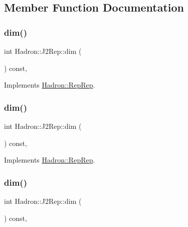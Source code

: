 \subsection{Member Function Documentation}
\mbox{\label{structHadron_1_1J2Rep_a9bbfe6d82db1e96beda068411ff79371}} 
\subsubsection{\texorpdfstring{dim()}{dim()}\hspace{0.1cm}{\footnotesize\ttfamily [1/5]}}
{\footnotesize\ttfamily int Hadron\+::\+J2\+Rep\+::dim (\begin{DoxyParamCaption}{ }\end{DoxyParamCaption}) const\hspace{0.3cm}{\ttfamily [inline]}, {\ttfamily [virtual]}}



Implements \mbox{\hyperlink{structHadron_1_1RepRep_a92c8802e5ed7afd7da43ccfd5b7cd92b}{Hadron\+::\+Rep\+Rep}}.

\mbox{\label{structHadron_1_1J2Rep_a9bbfe6d82db1e96beda068411ff79371}} 
\subsubsection{\texorpdfstring{dim()}{dim()}\hspace{0.1cm}{\footnotesize\ttfamily [2/5]}}
{\footnotesize\ttfamily int Hadron\+::\+J2\+Rep\+::dim (\begin{DoxyParamCaption}{ }\end{DoxyParamCaption}) const\hspace{0.3cm}{\ttfamily [inline]}, {\ttfamily [virtual]}}



Implements \mbox{\hyperlink{structHadron_1_1RepRep_a92c8802e5ed7afd7da43ccfd5b7cd92b}{Hadron\+::\+Rep\+Rep}}.

\mbox{\label{structHadron_1_1J2Rep_a9bbfe6d82db1e96beda068411ff79371}} 
\subsubsection{\texorpdfstring{dim()}{dim()}\hspace{0.1cm}{\footnotesize\ttfamily [3/5]}}
{\footnotesize\ttfamily int Hadron\+::\+J2\+Rep\+::dim (\begin{DoxyParamCaption}{ }\end{DoxyParamCaption}) const\hspace{0.3cm}{\ttfamily [inline]}, {\ttfamily [virtual]}}



